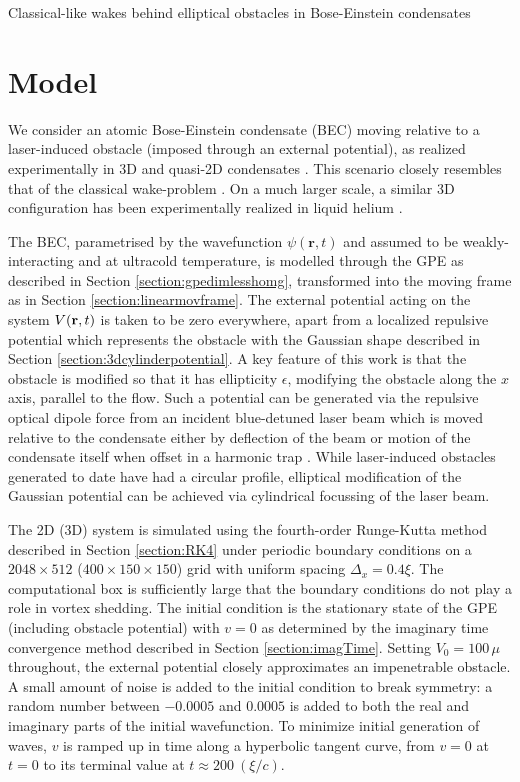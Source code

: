 \begin{chapter}{\label{cha:wake}Classical-like wakes behind elliptical obstacles in Bose-Einstein condensates}
\section{Model}

We consider an atomic Bose-Einstein condensate (BEC) moving relative to a laser-induced obstacle (imposed through 
an external potential), as realized experimentally in 3D \cite{Raman,Onofrio,Inouye,Neely} and quasi-2D condensates \cite{Neely}.  This scenario closely resembles that of the classical wake-problem \cite{taneda41,taneda112}.  On a much larger scale, a similar 
3D configuration has been experimentally realized in liquid helium 
\cite{VanSciver1999,VanSciver2005}.

The BEC, parametrised by the wavefunction $\psi(\mathbf{r},t)$ and assumed to be weakly-interacting and at ultracold temperature, is modelled through the GPE as described in Section \ref{section:gpedimlesshomg}, transformed into the moving frame as in Section \ref{section:linearmovframe}. The external potential acting on the system $V({\bf r}, t)$ is taken to be zero everywhere, apart from a localized repulsive potential which represents the obstacle with the Gaussian shape described in Section \ref{section:3dcylinderpotential}. A key feature of this work is that the obstacle is modified so that it has ellipticity $\epsilon$, modifying the obstacle along the $x$ axis, parallel to the flow. Such a potential can be generated via the repulsive optical dipole force from an incident blue-detuned laser beam which is moved relative to the condensate either by deflection of the beam \cite{Raman,Onofrio,Inouye} or motion of the condensate itself when offset in a harmonic trap \cite{Neely,kwon_moon_14,kwon_2015a}.  While laser-induced obstacles generated to date have had a circular profile, elliptical modification of the Gaussian potential can be achieved via cylindrical focussing of the laser beam.   

The 2D (3D) system is simulated using the fourth-order Runge-Kutta method described in Section \ref{section:RK4} under periodic boundary conditions on a $2048 \times 512$ ($400 \times 150 \times 150$) grid with uniform spacing $\Delta_x=0.4\xi$. The computational box is sufficiently large that the boundary conditions do not play a role in vortex shedding.  The initial condition is the stationary state of the GPE (including obstacle potential) with $v=0$ as determined by the imaginary time convergence method described in Section \ref{section:imagTime}. Setting $V_0=100\,\mu$ throughout, the external potential closely approximates an impenetrable obstacle. A small amount of noise is added to the initial condition to break symmetry: a random number between $-0.0005$ and $0.0005$ is added to both the real and imaginary parts of the initial wavefunction. To minimize initial generation of waves, $v$ is ramped up in time along a hyperbolic tangent curve, from $v=0$ at $t=0$ to its terminal value at $t\approx200~(\xi/c)$.


\end{chapter}
